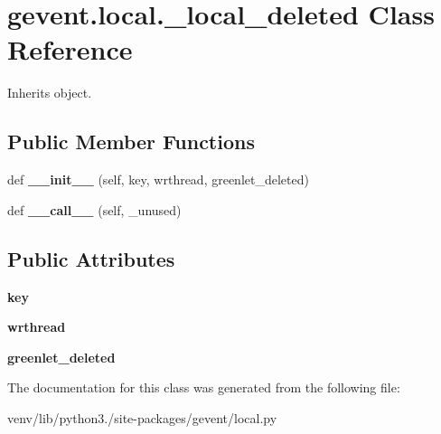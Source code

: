 \hypertarget{classgevent_1_1local_1_1__local__deleted}{}\section{gevent.\+local.\+\_\+local\+\_\+deleted Class Reference}
\label{classgevent_1_1local_1_1__local__deleted}


Inherits object.

\subsection*{Public Member Functions}
\begin{DoxyCompactItemize}
\item 
\mbox{\label{classgevent_1_1local_1_1__local__deleted_a87a4ad4094c5ab85bf0d98b580dd6808}} 
def {\bfseries \+\_\+\+\_\+init\+\_\+\+\_\+} (self, key, wrthread, greenlet\+\_\+deleted)
\item 
\mbox{\label{classgevent_1_1local_1_1__local__deleted_a7b39e1a209192381a0bb04ffc0d75e07}} 
def {\bfseries \+\_\+\+\_\+call\+\_\+\+\_\+} (self, \+\_\+unused)
\end{DoxyCompactItemize}
\subsection*{Public Attributes}
\begin{DoxyCompactItemize}
\item 
\mbox{\label{classgevent_1_1local_1_1__local__deleted_a1cc2c217e38129b33193081874a4f7e5}} 
{\bfseries key}
\item 
\mbox{\label{classgevent_1_1local_1_1__local__deleted_a8fccfc8f7d763365a72126367dc9bb75}} 
{\bfseries wrthread}
\item 
\mbox{\label{classgevent_1_1local_1_1__local__deleted_a0cd24bd91bedc87b9e7979bd6e3d7b46}} 
{\bfseries greenlet\+\_\+deleted}
\end{DoxyCompactItemize}


The documentation for this class was generated from the following file\+:\begin{DoxyCompactItemize}
\item 
venv/lib/python3./site-\/packages/gevent/local.\+py\end{DoxyCompactItemize}
